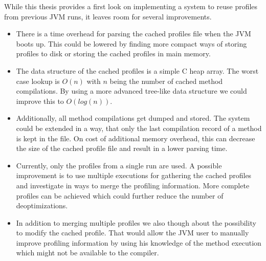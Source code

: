While this thesis provides a first look on implementing a system to reuse profiles from previous JVM runs, it leaves room for several improvements.
\begin{itemize}
  \item There is a time overhead for parsing the cached profiles file when the JVM boots up. This could be lowered by finding more compact ways of storing profiles to disk or storing the cached profiles in main memory.
  \item The data structure of the cached profiles is a simple C heap array. The worst case lookup is $O(n)$ with $n$ being the number of cached method compilations. By using a more advanced tree-like data structure we could improve this to $O(log(n))$.
  \item Additionally, all method compilations get dumped and stored. The system could be extended in a way, that only the last compilation record of a method is kept in the file. On cost of additional memory overhead, this can decrease the size of the cached profile file and result in a lower parsing time.
  \item Currently, only the profiles from a single run are used. A possible improvement is to use multiple executions for gathering the cached profiles and investigate in ways to merge the profiling information. More complete profiles can be achieved which could further reduce the number of deoptimizations.
  \item In addition to merging multiple profiles we also though about the possibility to modify the cached profile. That would allow the JVM user to manually improve profiling information by using his knowledge of the method execution which might not be available to the compiler.
\end{itemize}
